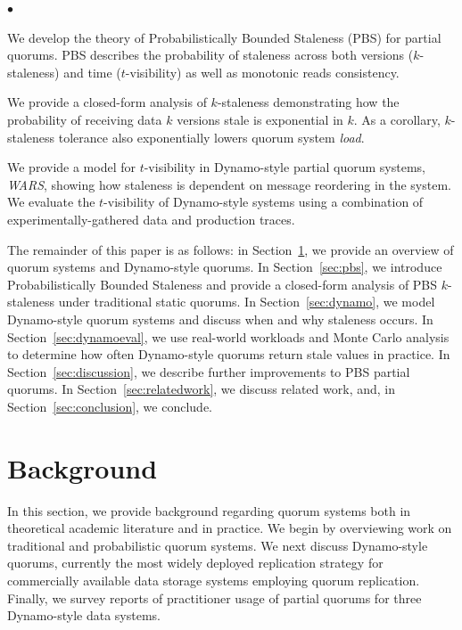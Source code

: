 \documentclass{vldb}
\newcommand{\sectionskip}{-0em}
\newenvironment{myitemize}
{
   \vspace{-.5em}
    \begin{list}{$\bullet$ }{}
        \setlength{\topsep}{0pt}
        \setlength{\parskip}{0pt}
        \setlength{\partopsep}{0pt}
        \setlength{\parsep}{0pt}         
        \setlength{\itemsep}{.5em} 
}
{
    \end{list} 
    \vspace{-.5em}
}
\begin{document}
\begin{myitemize}

\item We develop the theory of Probabilistically Bounded Staleness
  (PBS) for partial quorums. PBS describes the probability of
  staleness across both versions ($k$-staleness) and time
  ($t$-visibility) as well as monotonic reads consistency.

\item We provide a closed-form analysis of $k$-staleness demonstrating
  how the probability of receiving data $k$ versions stale is
  exponential in $k$.  As a corollary, $k$-staleness tolerance also
  exponentially lowers quorum system \textit{load}.

\item We provide a model for $t$-visibility in
  Dynamo-style partial quorum systems, \textit{WARS},  showing how
  staleness is dependent on message reordering in the system.  We
  evaluate the $t$-visibility of Dynamo-style systems using a
  combination of experimentally-gathered data and production traces.

\end{myitemize}

The remainder of this paper is as follows: in
Section~\ref{sec:background}, we provide an overview of quorum systems
and Dynamo-style quorums.  In Section~\ref{sec:pbs}, we introduce
Probabilistically Bounded Staleness and provide a closed-form analysis of PBS
 $k$-staleness under traditional static quorums.  In
Section~\ref{sec:dynamo}, we model Dynamo-style quorum systems and
discuss when and why staleness occurs.  In Section~\ref{sec:dynamoeval}, we
use real-world workloads and Monte Carlo analysis to determine how
often Dynamo-style quorums return stale values in practice.  In
Section~\ref{sec:discussion}, we describe further improvements to
PBS partial quorums. In Section~\ref{sec:relatedwork}, we discuss
related work, and, in Section~\ref{sec:conclusion}, we conclude.


\vspace{\sectionskip}\section{Background}
\label{sec:background}

In this section, we provide background regarding quorum systems both
in theoretical academic literature and in practice.  We begin by
overviewing work on traditional and probabilistic quorum systems.  We
next discuss Dynamo-style quorums, currently the most widely deployed
replication strategy for commercially available data storage systems
employing quorum replication.  Finally, we survey reports of
practitioner usage of partial quorums for three Dynamo-style data
systems.
\end{document}

